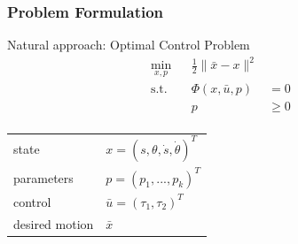 \begin{frame}
    \frametitle{Problem Formulation}
    Natural approach: Optimal Control Problem
    \begin{align*}
        \min_{x,p} & & \frac{1}{2} \| \bar{x} - x \|^2 & & \\
        \operatorname{s.t.} & & \Phi(x,\bar{u},p) & = 0 & & \\
                            & & p & \geq 0 & & \\
    \end{align*}

    \begin{tabular}{ll}
        state & $ x = (s,\theta,\dot{s},\dot{\theta})^T $ \\
        parameters & $ p = (p_1,...,p_k)^T $ \\
        control & $ \bar{u} = (\tau_1,\tau_2)^T $ \\
        desired motion & $\bar{x}$ \\
    \end{tabular}
\end{frame}

%
%

